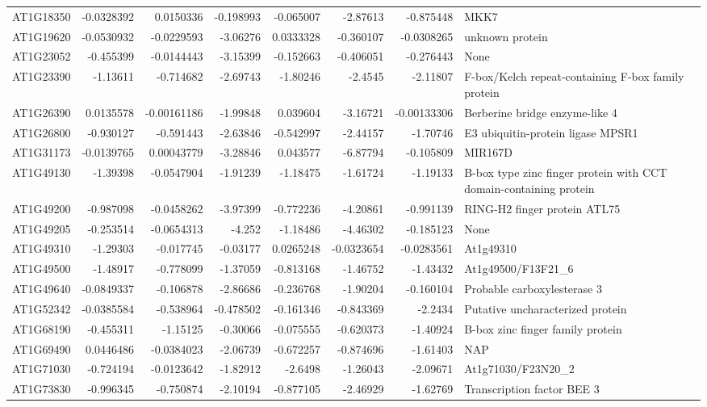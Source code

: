 \documentclass[11pt]{article}
\begin{document}
\begin{center}
\begin{tabular}{lrrrrrrl}
AT1G18350 & -0.0328392 & 0.0150336 & -0.198993 & -0.065007 & -2.87613 & -0.875448 & MKK7\\
AT1G19620 & -0.0530932 & -0.0229593 & -3.06276 & 0.0333328 & -0.360107 & -0.0308265 & unknown protein\\
AT1G23052 & -0.455399 & -0.0144443 & -3.15399 & -0.152663 & -0.406051 & -0.276443 & None\\
AT1G23390 & -1.13611 & -0.714682 & -2.69743 & -1.80246 & -2.4545 & -2.11807 & F-box/Kelch repeat-containing F-box family protein\\
AT1G26390 & 0.0135578 & -0.00161186 & -1.99848 & 0.039604 & -3.16721 & -0.00133306 & Berberine bridge enzyme-like 4\\
AT1G26800 & -0.930127 & -0.591443 & -2.63846 & -0.542997 & -2.44157 & -1.70746 & E3 ubiquitin-protein ligase MPSR1\\
AT1G31173 & -0.0139765 & 0.00043779 & -3.28846 & 0.043577 & -6.87794 & -0.105809 & MIR167D\\
AT1G49130 & -1.39398 & -0.0547904 & -1.91239 & -1.18475 & -1.61724 & -1.19133 & B-box type zinc finger protein with CCT domain-containing protein\\
AT1G49200 & -0.987098 & -0.0458262 & -3.97399 & -0.772236 & -4.20861 & -0.991139 & RING-H2 finger protein ATL75\\
AT1G49205 & -0.253514 & -0.0654313 & -4.252 & -1.18486 & -4.46302 & -0.185123 & None\\
AT1G49310 & -1.29303 & -0.017745 & -0.03177 & 0.0265248 & -0.0323654 & -0.0283561 & At1g49310\\
AT1G49500 & -1.48917 & -0.778099 & -1.37059 & -0.813168 & -1.46752 & -1.43432 & At1g49500/F13F21\_6\\
AT1G49640 & -0.0849337 & -0.106878 & -2.86686 & -0.236768 & -1.90204 & -0.160104 & Probable carboxylesterase 3\\
AT1G52342 & -0.0385584 & -0.538964 & -0.478502 & -0.161346 & -0.843369 & -2.2434 & Putative uncharacterized protein\\
AT1G68190 & -0.455311 & -1.15125 & -0.30066 & -0.075555 & -0.620373 & -1.40924 & B-box zinc finger family protein\\
AT1G69490 & 0.0446486 & -0.0384023 & -2.06739 & -0.672257 & -0.874696 & -1.61403 & NAP\\
AT1G71030 & -0.724194 & -0.0123642 & -1.82912 & -2.6498 & -1.26043 & -2.09671 & At1g71030/F23N20\_2\\
AT1G73830 & -0.996345 & -0.750874 & -2.10194 & -0.877105 & -2.46929 & -1.62769 & Transcription factor BEE 3\\

\end{tabular}
\end{center}
\end{document}
